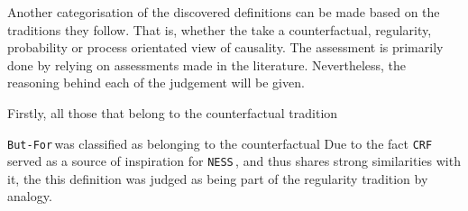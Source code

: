 \documentclass[11pt,a4paper]{book}
\theoremstyle{definition}
\theoremstyle{definition}
\theoremstyle{definition}
\theoremstyle{remark}
\newcommand{\butfor}{\texttt{But-For}\,}
\newcommand{\crf}{\texttt{CRF}\,}
\newcommand{\ness}{\texttt{NESS}\,}
\begin{document}
Another categorisation of the discovered definitions can be made based on the traditions they follow. That is, whether the take a counterfactual, regularity, probability or process orientated view of causality.
The assessment is primarily done by relying on assessments made in the literature. Nevertheless, the reasoning behind each of the judgement will be given.  

Firstly, all those that belong to the counterfactual tradition



\butfor was classified as belonging to the counterfactual 
Due to the fact \crf served as a source of inspiration for \ness, and thus shares strong similarities with it, the this definition was judged as being part of the regularity tradition by analogy.
\end{document}
